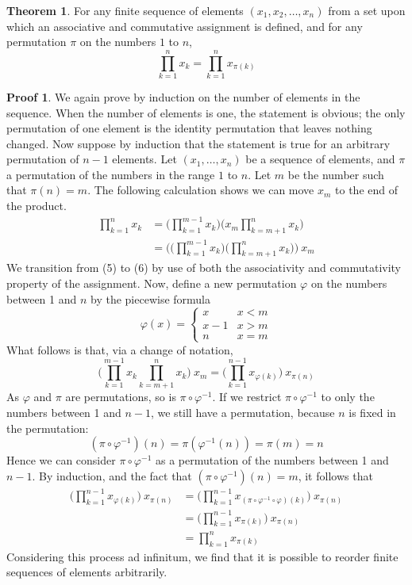 \documentclass[12pt]{amsbook}
\theoremstyle{definition}
\newtheorem{theorem}{Theorem}[chapter]
\newtheorem*{prf}{Proof}
\begin{document}
\begin{theorem}
    For any finite sequence of elements $(x_1, x_2, \dots, x_n)$ from a set upon which an associative and commutative assignment is defined, and for any permutation $\pi$ on the numbers $1$ to $n$,
    \[ \prod_{k=1}^n x_k = \prod_{k=1}^n x_{\pi(k)} \]
\end{theorem}
\begin{prf}
    We again prove by induction on the number of elements in the sequence. When the number of elements is one, the statement is obvious; the only permutation of one element is the identity permutation that leaves nothing changed. Now suppose by induction that the statement is true for an arbitrary permutation of $n-1$ elements. Let $(x_1, \dots, x_n)$ be a sequence of elements, and $\pi$ a permutation of the numbers in the range $1$ to $n$. Let $m$ be the number such that $\pi(n) = m$. The following calculation shows we can move $x_m$ to the end of the product.
    \begin{align}
    \prod_{k=1}^n x_k &= \big( \prod_{k=1}^{m-1} x_k \big) \big( x_m \prod_{k=m+1}^n x_k \big)\\
    &= \Big( \big( \prod_{k=1}^{m-1} x_k \big) \big( \prod_{k=m+1}^n x_k \big) \Big)\ x_m
    \end{align}
    We transition from (5) to (6) by use of both the associativity and commutativity property of the assignment. Now, define a new permutation $\varphi$ on the numbers between 1 and $n$ by the piecewise formula
    \[ \varphi(x) = \begin{cases} x   & x < m\\
                               x-1 & x > m\\
                               n   & x = m \end{cases} \]
    What follows is that, via a change of notation,
    \[ \big( \prod_{k=1}^{m-1} x_k \prod_{k=m+1}^n x_k \big)\ x_m = \big( \prod_{k=1}^{n-1} x_{\varphi(k)} \big)\ x_{\pi(n)} \]
    As $\varphi$ and $\pi$ are permutations, so is $\pi \circ \varphi^{-1}$. If we restrict $\pi \circ \varphi^{-1}$ to only the numbers between 1 and $n-1$, we still have a permutation, because $n$ is fixed in the permutation:
    \[(\pi \circ \varphi^{-1})(n) = \pi(\varphi^{-1}(n)) = \pi(m) = n \]
    Hence we can consider $\pi \circ \varphi^{-1}$ as a permutation of the numbers between 1 and $n-1$. By induction, and the fact that $(\pi \circ \varphi^{-1})(n) = m$, it follows that
    \begin{align*}
        \big( \prod_{k=1}^{n-1} x_{\varphi(k)} \big)\ x_{\pi(n)} &= \big( \prod_{k=1}^{n-1} x_{(\pi \circ \varphi^{-1} \circ \varphi)(k)} \big)\ x_{\pi(n)}\\
        &= \big( \prod_{k=1}^{n-1} x_{\pi(k)} \big)\ x_{\pi(n)}\\
        &= \prod_{k=1}^n x_{\pi(k)}
    \end{align*}
    Considering this process ad infinitum, we find that it is possible to reorder finite sequences of elements arbitrarily.
\end{prf}
\end{document}
